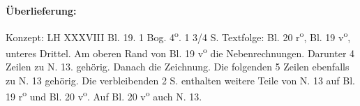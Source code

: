    
        
        \begin{ledgroupsized}[r]{120mm}
        \footnotesize 
        \pstart        
        \noindent\textbf{\"{U}berlieferung:}  
        \pend
        \end{ledgroupsized}
      
       
              \begin{ledgroupsized}[r]{114mm}
              \footnotesize 
              \pstart \parindent -6mm
              Konzept: LH XXXVIII Bl. 19. 1 Bog. 4\textsuperscript{o}. 1 3/4 S. Textfolge: Bl. 20 r\textsuperscript{o}, Bl. 19 v\textsuperscript{o}, unteres Drittel. Am oberen Rand von Bl. 19 v\textsuperscript{o} die Nebenrechnungen. Darunter 4 Zeilen zu N. 13. geh\"{o}rig. Danach die Zeichnung. Die folgenden 5 Zeilen ebenfalls zu N. 13 geh\"{o}rig. Die verbleibenden 2 S. enthalten weitere Teile von N. 13 auf Bl. 19 r\textsuperscript{o} und Bl. 20 v\textsuperscript{o}. Auf Bl. 20 v\textsuperscript{o} auch N. 13. \pend
              \end{ledgroupsized}
       
